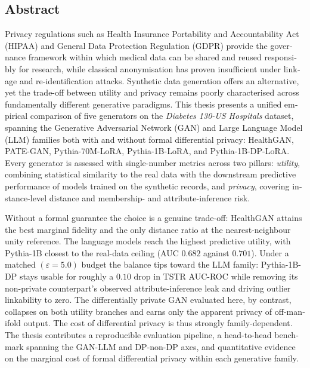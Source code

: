 \begin{otherlanguage}{english}
    \section*{Abstract}

    Privacy regulations such as Health Insurance Portability and Accountability Act 
    (HIPAA) and General Data Protection Regulation (GDPR) provide the governance 
    framework within which medical data can be shared and reused responsibly 
    for research, while classical anonymisation has
    proven insufficient under linkage and re-identification attacks. Synthetic
    data generation offers an alternative, yet the trade-off between utility and
    privacy remains poorly characterised across fundamentally different
    generative paradigms. This thesis presents a unified empirical comparison of
    five generators on the \emph{Diabetes 130-US Hospitals} dataset, spanning
    the Generative Adversarial Network (GAN) and Large Language Model (LLM) 
    families both with and without formal differential privacy:
    HealthGAN, PATE-GAN, Pythia-70M-LoRA, Pythia-1B-LoRA, and Pythia-1B-DP-LoRA.
    Every generator is assessed with single-number metrics across two pillars:
    \emph{utility}, combining statistical similarity to the real data with the
    downstream predictive performance of models trained on the synthetic
    records, and \emph{privacy}, covering instance-level distance and
    membership- and attribute-inference risk.

    Without a formal guarantee the choice is a
    genuine trade-off: HealthGAN attains the best marginal fidelity and the only
    distance ratio at the nearest-neighbour unity reference. The language models
    reach the highest predictive utility, with Pythia-1B closest to the
    real-data ceiling (AUC $0.682$ against $0.701$). Under a matched
    $(\varepsilon = 5.0)$ budget the balance tips toward the LLM family:
    Pythia-1B-DP stays usable for roughly a $0.10$ drop in TSTR AUC-ROC while
    removing its non-private counterpart's observed attribute-inference leak
    and driving outlier linkability to zero. The differentially private GAN
    evaluated here, by contrast, collapses on both utility branches and earns
    only the apparent privacy of off-manifold output. The cost of differential privacy is thus
    strongly family-dependent. The thesis contributes a reproducible evaluation
    pipeline, a head-to-head benchmark spanning the GAN-LLM and DP-non-DP axes,
    and quantitative evidence on the marginal cost of formal differential
    privacy within each generative family.
\end{otherlanguage}
\cleardoublepage
